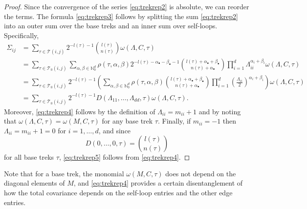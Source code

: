 \documentclass[10pt,twoside,a4paper]{amsart}
\begin{document}
\begin{proof} Since the convergence of the series \eqref{eq:trekrep2} is absolute, we can reorder  the terms.    
    The formula \eqref{eq:trekrep3} follows by splitting the sum \eqref{eq:trekrep2} into 
    an outer sum over the base treks and an inner sum over self-loops. 
    Specifically, 
    \begin{align*}
        \Sigma_{ij} & = \sum_{\tau \in \mathcal{T}(i,j)} 
        2^{-l(\tau) - 1} {l(\tau) \choose n(\tau)}
        \omega(\Lambda, C, \tau) \\
        & = \sum_{\tau \in \mathcal{T}_0(i,j)} 
        \sum_{\alpha, \beta \in \mathbb{N}_0^d}
        \rho(\tau, \alpha, \beta) 
        2^{-l(\tau) - \alpha_{\bullet} - \beta_{\bullet}- 1} 
        {l(\tau) + \alpha_{\bullet} + \beta_{\bullet} \choose n(\tau) + \alpha_{\bullet}}
        \prod_{i=1}^d \Lambda_{ii}^{\alpha_i + \beta_i}  \omega(\Lambda, C, \tau) \\
        & = \sum_{\tau \in \mathcal{T}_0(i,j)} 
        2^{-l(\tau) - 1} \left(\sum_{\alpha, \beta \in \mathbb{N}_0^d}
        \rho(\tau, \alpha, \beta)
        {l(\tau)  + \alpha_{\bullet} + \beta_{\bullet}  \choose n(\tau)  + \alpha_{\bullet}  } 
        \prod_{i=1}^d \left(\frac{\Lambda_{ii}}{2}\right)^{\alpha_i + \beta_i}\right)  
        \omega(\Lambda, C, \tau) \\
        & = \sum_{\tau \in \mathcal{T}_0(i,j)} 
        2^{-l(\tau) - 1} D(\Lambda_{11}, \ldots, \Lambda_{dd}, \tau)
        \omega(\Lambda, C, \tau).
    \end{align*}
    Moreover, \eqref{eq:trekrep4} follows by the definition of
    $\Lambda_{ii} = m_{ii} + 1$ and by noting that  $\omega(\Lambda, C, \tau)
    =   \omega(M, C, \tau)$ for any base trek $\tau$.
    Finally, if $m_{ii} = -1$ then $\Lambda_{ii} = m_{ii} + 1 = 0$ for 
    $i = 1, \ldots, d$, and since 
    $$D(0, \ldots, 0, \tau) = {l(\tau) \choose n(\tau)}$$ 
    for all base treks $\tau$, \eqref{eq:trekrep5} follows from \eqref{eq:trekrep4}.
\end{proof}

Note that for a base trek, the monomial 
$\omega(M, C, \tau)$ does not depend on the 
diagonal elements of $M$, and \eqref{eq:trekrep4} 
provides a certain disentanglement of how the total 
covariance depends on the self-loop entries 
and the other edge entries.

\end{document}

